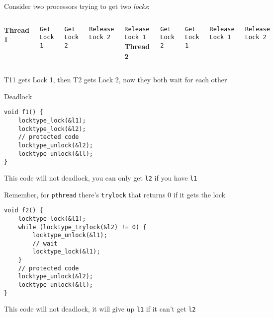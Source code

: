   \begin{slide}


    Consider two processors trying to get two {\it locks}:
    \medskip

    \begin{columns}
        {\bf Thread 1}

        \verb+Get Lock 1+

        \verb+Get Lock 2+

        \verb+Release Lock 2+

        \verb+Release Lock 1+
        {\bf Thread 2}

        \verb+Get Lock 2+

        \verb+Get Lock 1+

        \verb+Release Lock 1+

        \verb+Release Lock 2+
    \end{columns}
    \medskip

    T11 gets Lock 1, then T2 gets Lock 2, now
    they both wait for each other

    \leftspace{}Deadlock

  \end{slide}

  \begin{slide}


    \begin{verbatim}
void f1() {
    locktype_lock(&l1);
    locktype_lock(&l2);
    // protected code
    locktype_unlock(&l2);
    locktype_unlock(&ll);    
}
    \end{verbatim}
    \medskip

    This code will not deadlock, you can only get {\tt l2} if you have
    {\tt l1}

  \end{slide}

  \begin{slide}


    Remember, for {\tt pthread} there's {\tt trylock} that returns 0 if it gets
    the lock
    \medskip

    \begin{verbatim}
void f2() {
    locktype_lock(&l1);
    while (locktype_trylock(&l2) != 0) {
        locktype_unlock(&l1);
        // wait
        locktype_lock(&l1);
    }
    // protected code
    locktype_unlock(&l2);
    locktype_unlock(&ll);    
}
    \end{verbatim}
    \medskip

    This code will not deadlock, it will give up {\tt l1} if it can't get
    {\tt l2}

  \end{slide}

